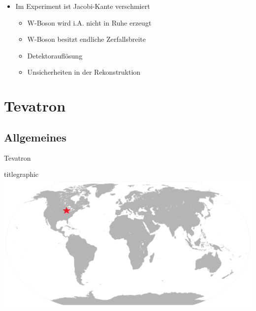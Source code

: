 \documentclass[aspectratio=1610, 9pt]{beamer}
\begin{document}
\begin{frame}
  \begin{itemize}

    \item Im Experiment ist Jacobi-Kante verschmiert
    \begin{itemize}
      \item[\rightarrow] W-Boson wird i.A. nicht in Ruhe erzeugt
      \item[\rightarrow] W-Boson besitzt endliche Zerfallsbreite
      \item[\rightarrow] Detektorauflösung
      \item[\rightarrow] Unsicherheiten in der Rekonstruktion
    \end{itemize}
  \end{itemize}
\end{frame}

\section{Tevatron}

\subsection{Allgemeines}

\begin{frame}{Tevatron}
  \begin{beamercolorbox}[center, wd=\textwidth]{titlegraphic}
    \includegraphics[width=\textwidth]{images/map.png}
  \end{beamercolorbox}%
\end{frame}
\end{document}
